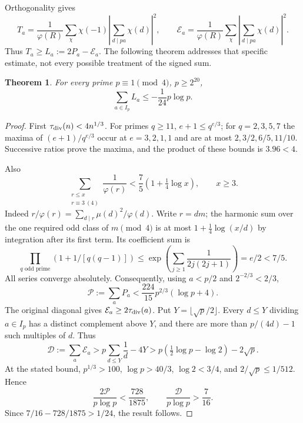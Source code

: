 \documentclass[10pt,reqno]{amsart}
\newtheorem{theorem}{Theorem}
\begin{document}
Orthogonality gives
\[
 T_a=\frac1{\varphi(R)}\sum_\chi\chi(-1)
       \left|\sum_{d\mid pa}\chi(d)\right|^2,
 \qquad
 \mathcal E_a=\frac1{\varphi(R)}\sum_\chi
       \left|\sum_{d\mid pa}\chi(d)\right|^2.
\]
Thus $T_a\ge L_a:=2P_a-\mathcal E_a$. The following theorem addresses that
specific estimate, not every possible treatment of the signed sum.

\begin{theorem}\label{thm:neg}
For every prime $p\equiv1\pmod4$, $p\ge2^{20}$,
\[
 \boxed{\sum_{a\in I_p}L_a\le-\frac1{24}p\log p.}
\]
\end{theorem}
\begin{proof}
First $\tau_{\rm div}(n)<4n^{1/3}$. For primes $q\ge11$, $e+1\le q^{e/3}$;
for $q=2,3,5,7$ the maxima of $(e+1)/q^{e/3}$ occur at $e=3,2,1,1$ and
are at most $2,3/2,6/5,11/10$. Successive ratios prove the maxima, and the
product of these bounds is $3.96<4$.

Also
\[
 \sum_{\substack{r\le x\\r\equiv3\ (4)}}\frac1{\varphi(r)}
 <\frac75(1+\tfrac14\log x),\qquad x\ge3.
\]
Indeed $r/\varphi(r)=\sum_{d\mid r}\mu(d)^2/\varphi(d)$. Write $r=dm$;
the harmonic sum over the one required odd class of $m\pmod4$ is at most
$1+\frac14\log(x/d)$ by integration after its first term. Its coefficient sum is
\[
 \prod_{q\text{ odd prime}}(1+1/[q(q-1)])
 \le\exp\!\left(\sum_{j\ge1}\frac1{2j(2j+1)}\right)
 =e/2<7/5.
\]
All series converge absolutely. Consequently, using $a<p/2$ and
$2^{-2/3}<2/3$,
\[
 \mathcal P:=\sum_aP_a<\frac{224}{15}p^{2/3}(\log p+4).
\]
The original diagonal gives $\mathcal E_a\ge2\tau_{\rm div}(a)$. Put
$Y=\lfloor\sqrt p/2\rfloor$. Every $d\le Y$ dividing $a\in I_p$ has a distinct
complement above $Y$, and there are more than $p/(4d)-1$ such multiples of $d$.
Thus
\[
 \mathcal D:=\sum_a\mathcal E_a
 >p\sum_{d\le Y}\frac1d-4Y
 >p(\tfrac12\log p-\log2)-2\sqrt p.
\]
At the stated bound, $p^{1/3}>100$, $\log p>40/3$,
$\log2<3/4$, and $2/\sqrt p\le1/512$. Hence
\[
 \frac{2\mathcal P}{p\log p}<\frac{728}{1875},\qquad
 \frac{\mathcal D}{p\log p}>\frac7{16}.
\]
Since $7/16-728/1875>1/24$, the result follows.
\end{proof}
\end{document}
